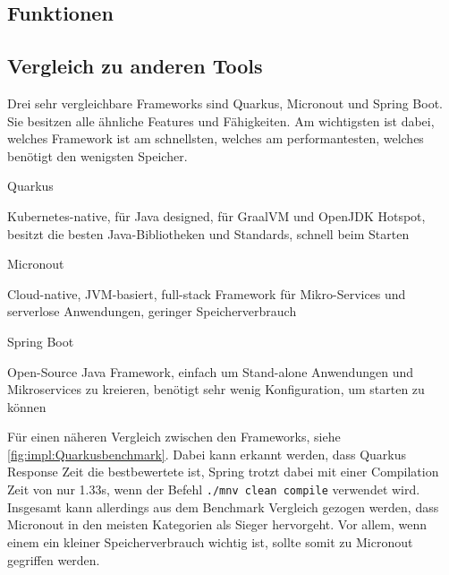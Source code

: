\subsection{Funktionen}
\subsection{Vergleich zu anderen Tools}
Drei sehr vergleichbare Frameworks sind Quarkus, Micronout und Spring Boot. Sie besitzen alle ähnliche Features und Fähigkeiten.
Am wichtigsten ist dabei, welches Framework ist am schnellsten, welches am performantesten, welches benötigt den wenigsten Speicher.
\cite{Micr/QuarBenchmark}
 
\begin{compactitem}
    \item[Quarkus]
    \item Kubernetes-native, für Java designed, für GraalVM und OpenJDK Hotspot, besitzt die besten Java-Bibliotheken und Standards, schnell beim Starten
    \item[Micronout]
    \item Cloud-native, JVM-basiert, full-stack Framework für Mikro-Services und serverlose Anwendungen, geringer Speicherverbrauch
    \item[Spring Boot]
    \item Open-Source Java Framework, einfach um Stand-alone Anwendungen und Mikroservices zu kreieren, benötigt sehr wenig Konfiguration, um starten zu können
\end{compactitem}
\cite{Micr/QuarBenchmark}
 
Für einen näheren Vergleich zwischen den Frameworks, siehe \ref{fig:impl:Quarkusbenchmark}. Dabei kann erkannt werden, dass Quarkus Response Zeit die bestbewertete ist, Spring trotzt dabei mit einer Compilation Zeit von nur 1.33s, wenn der Befehl \texttt{./mnv clean compile} verwendet wird. Insgesamt kann allerdings aus dem Benchmark Vergleich gezogen werden, dass Micronout in den meisten Kategorien als Sieger hervorgeht. Vor allem, wenn einem ein kleiner Speicherverbrauch wichtig ist, sollte somit zu Micronout gegriffen werden. \cite{MicrVSQuarVSSprin}
 
